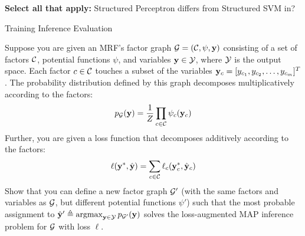\documentclass[11pt,addpoints,answers]{exam}
\numberwithin{equation}{section} %
\numberwithin{figure}{section} %
\numberwithin{table}{section} %
\newcommand \argmax {\operatorname*{argmax}}
\begin{document}
\begin{questions}

\question[1] \textbf{Select all that apply:} Structured Perceptron differs from Structured SVM in?
    {%
    \checkboxchar{$\Box$} \checkedchar{$\blacksquare$} %
    \begin{checkboxes}
     \choice Training
     \choice Inference
     \choice Evaluation
    \end{checkboxes}
    }
    
\question[4] 
Suppose you are given an MRF's factor graph $\mathcal{G} = (\mathcal{C}, \psi, \mathbf{y})$ consisting of a set of factors $\mathcal{C}$, potential functions $\psi$, and variables $\mathbf{y} \in \mathcal{Y}$, where $\mathcal{Y}$ is the output space. Each factor $c \in \mathcal{C}$ touches a subset of the variables $\mathbf{y}_c = [y_{c_1}, y_{c_2}, \ldots, y_{c_m}]^T$. The probability distribution defined by this graph decomposes multiplicatively according to the factors:
\begin{align*}
    p_{\mathcal{G}}(\mathbf{y}) = \frac{1}{Z} \prod_{c \in \mathcal{C}} \psi_c(\mathbf{y}_c)
\end{align*}
Further, you are given a loss function that decomposes additively according to the factors:
\begin{align*}
    \ell(\mathbf{y}^*, \hat{\mathbf{y}}) = \sum_{c \in \mathcal{C}} \ell_c(\mathbf{y}_c^*, \hat{\mathbf{y}}_c)
\end{align*}
Show that you can define a new factor graph $\mathcal{G}'$ (with the same factors and variables as $\mathcal{G}$, but different potential functions $\psi'$) such that the most probable assignment to $\hat{\yv}' \triangleq \argmax_{\yv \in \Yc} p_{\Gc'}(\yv)$ solves the loss-augmented MAP inference problem for $\mathcal{G}$ with loss $\ell$.
    \begin{tcolorbox}[fit,height=12cm, width=15cm, blank, borderline={1pt}{-2pt}]
    \end{tcolorbox}
    
\end{questions}
\end{document}
